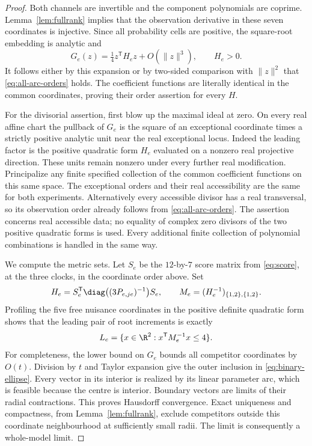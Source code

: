 \begin{proof}
Both channels are invertible and the component polynomials are coprime.
Lemma~\ref{lem:fullrank} implies that the observation derivative in
these seven coordinates is injective. Since all probability cells are
positive, the square-root embedding is analytic and
\[
 G_e(z)=\tfrac14 z^{\mathsf T}H_ez+O(\|z\|^3),\qquad H_e>0.
\]
It follows either by this expansion or by two-sided comparison with
$\|z\|^2$ that \eqref{eq:all-arc-orders} holds. The coefficient functions
are literally identical in the common coordinates, proving their order
assertion for every $H$.

For the divisorial assertion, first blow up the maximal ideal at zero.
On every real affine chart the pullback of $G_e$ is the square of an
exceptional coordinate times a strictly positive analytic unit near the
real exceptional locus. Indeed the leading factor is the positive
quadratic form $H_e$ evaluated on a nonzero real projective direction.
These units remain nonzero under every further real modification.
Principalize any finite specified collection of the common coefficient
functions on this same space. The exceptional orders and their real
accessibility are the same for both experiments. Alternatively every
accessible divisor has a real transversal, so its observation order
already follows from \eqref{eq:all-arc-orders}. The assertion concerns
real accessible data; no equality of complex zero divisors of the two
positive quadratic forms is used. Every additional finite collection of
polynomial combinations is handled in the same way.

We compute the metric sets. Let $S_e$ be the $12$-by-$7$ score matrix
from \eqref{eq:score}, at the three clocks, in the coordinate order above.
Set
\[
 H_e=S_e^{\mathsf T}\diag\bigl((3P_{e,je})^{-1}\bigr)S_e,
 \qquad M_e=(H_e^{-1})_{\{1,2\},\{1,2\}}.
\]
Profiling the five free nuisance coordinates in the positive definite
quadratic form shows that the leading pair of root increments is exactly
\begin{equation}\label{eq:binary-ellipse}
 L_e=\{x\in\R^2:x^{\mathsf T}M_e^{-1}x\le4\}.
\end{equation}
For completeness, the lower bound on $G_e$ bounds all competitor
coordinates by $O(t)$. Division by $t$ and Taylor expansion give the
outer inclusion in \eqref{eq:binary-ellipse}. Every vector in its
interior is realized by its linear parameter arc, which is feasible
because the centre is interior. Boundary vectors are limits of their
radial contractions. This proves Hausdorff convergence. Exact uniqueness
and compactness, from Lemma~\ref{lem:fullrank}, exclude competitors
outside this coordinate neighbourhood at sufficiently small radii.
The limit is consequently a whole-model limit.


\end{proof}

